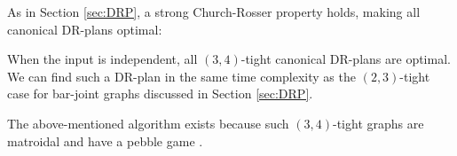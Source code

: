 

As in Section \ref{sec:DRP},  a strong Church-Rosser property holds, making all canonical DR-plans optimal:
%
\begin{observation*}\label{rem:1dofcanon}
    When the input is independent, all $(3,4)$-tight canonical DR-plans are optimal. We can find such a DR-plan in the same time complexity as the $(2,3)$-tight case for bar-joint graphs discussed in Section \ref{sec:DRP}.
\end{observation*}

The above-mentioned algorithm exists because such $(3,4)$-tight graphs are matroidal and have a pebble game \cite{Lee:2007:PGA}.

\ClearMyMinHeight
{}

